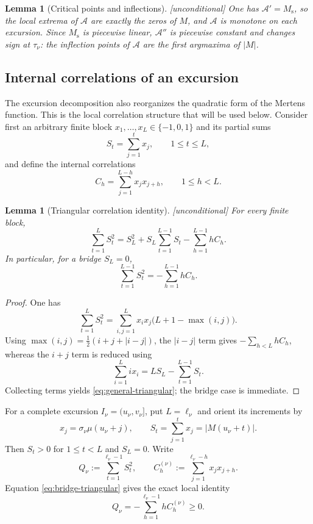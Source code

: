 \documentclass[11pt,reqno]{amsart}
\theoremstyle{plain}
\newtheorem{lemma}[theorem]{Lemma}
\theoremstyle{definition}
\newcommand{\Ms}{M_{\mathrm{s}}}
\newcommand{\Anet}{\mathcal{A}}
\begin{document}
\begin{lemma}[Critical points and inflections]
\label{lem:critical}
\emph{[unconditional]} One has $\Anet'=\Ms$, so the local extrema of
$\Anet$ are exactly the zeros of $M$, and $\Anet$ is monotone on each
excursion. Since $\Ms$ is piecewise linear, $\Anet''$ is piecewise constant
and changes sign at $\tau_\nu$: the inflection points of $\Anet$ are the
first argmaxima of $|M|$.
\end{lemma}



\subsection{Internal correlations of an excursion}
\label{subsec:internal-corr}

The excursion decomposition also reorganizes the quadratic form of the
Mertens function.  This is the local correlation structure that will be used
below.  Consider first an arbitrary finite block $x_1,\dots,x_L\in\{-1,0,1\}$
and its partial sums
\[
  S_t=\sum_{j=1}^t x_j,\qquad 1\le t\le L,
\]
and define the internal correlations
\[
  C_h=\sum_{j=1}^{L-h}x_jx_{j+h},\qquad 1\le h<L.
\]

\begin{lemma}[Triangular correlation identity]
\label{lem:triangular-corr}
\emph{[unconditional]} For every finite block,
\begin{equation}
\label{eq:general-triangular}
  \sum_{t=1}^{L}S_t^2
  =S_L^2+S_L\sum_{t=1}^{L-1}S_t-\sum_{h=1}^{L-1}hC_h.
\end{equation}
In particular, for a bridge $S_L=0$,
\begin{equation}
\label{eq:bridge-triangular}
  \sum_{t=1}^{L-1}S_t^2=-\sum_{h=1}^{L-1}hC_h.
\end{equation}
\end{lemma}

\begin{proof}
One has
\[
  \sum_{t=1}^{L}S_t^2
  =\sum_{i,j=1}^{L}x_ix_j\bigl(L+1-\max(i,j)\bigr).
\]
Using $\max(i,j)=\tfrac12(i+j+|i-j|)$, the $|i-j|$ term gives
$-\sum_{h<L}hC_h$, whereas the $i+j$ term is reduced using
\[
  \sum_{i=1}^{L} i x_i
  =LS_L-\sum_{t=1}^{L-1}S_t.
\]
Collecting terms yields \eqref{eq:general-triangular}; the bridge case is
immediate.
\end{proof}

For a complete excursion $I_\nu=(u_\nu,v_\nu]$, put $L=\ell_\nu$ and orient
its increments by
\[
  x_j=\sigma_\nu\mu(u_\nu+j),\qquad
  S_t=\sum_{j=1}^{t}x_j=|M(u_\nu+t)|.
\]
Then $S_t>0$ for $1\le t<L$ and $S_L=0$.  Write
\[
  Q_\nu:=\sum_{t=1}^{\ell_\nu-1}S_t^2,
  \qquad
  C_h^{(\nu)}:=\sum_{j=1}^{\ell_\nu-h}x_jx_{j+h}.
\]
Equation \eqref{eq:bridge-triangular} gives the exact local identity
\begin{equation}
\label{eq:Qcorr}
  Q_\nu=-\sum_{h=1}^{\ell_\nu-1}hC_h^{(\nu)}\ge0.
\end{equation}
\end{document}
